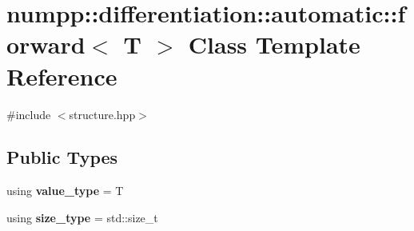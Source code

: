\hypertarget{classnumpp_1_1differentiation_1_1automatic_1_1forward}{}\section{numpp\+:\+:differentiation\+:\+:automatic\+:\+:forward$<$ T $>$ Class Template Reference}
\label{classnumpp_1_1differentiation_1_1automatic_1_1forward}


{\ttfamily \#include $<$structure.\+hpp$>$}

\subsection*{Public Types}
\begin{DoxyCompactItemize}
\item 
\mbox{\label{classnumpp_1_1differentiation_1_1automatic_1_1forward_ad360786eabc5ef8ba98e13431dc43f9e}} 
using {\bfseries value\+\_\+type} = T
\item 
\mbox{\label{classnumpp_1_1differentiation_1_1automatic_1_1forward_a5cf8dbc6f2eaea64516093d742238cef}} 
using {\bfseries size\+\_\+type} = std\+::size\+\_\+t
\end{DoxyCompactItemize}

